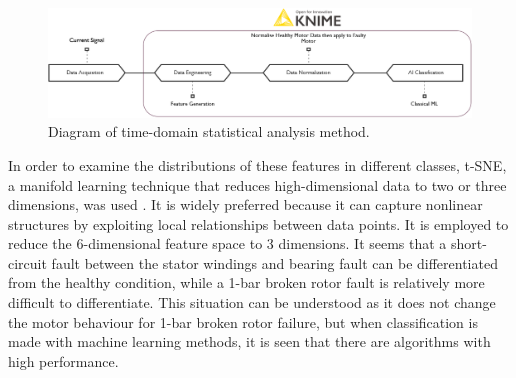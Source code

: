 	
	  

\begin{figure}[h]
	\centering
	\includegraphics[width=400pt,keepaspectratio=true]{./fig/method1.PNG}
	\caption{Diagram of time-domain statistical analysis method.}	
	\label{method1}
\end{figure}

In order to examine the distributions of these features in different classes, t-SNE, a manifold learning technique that reduces high-dimensional data to two or three dimensions, was used \cite{van2008visualizing}. It is widely preferred because it can capture nonlinear structures by exploiting local relationships between data points. It is employed to reduce the 6-dimensional feature space to 3 dimensions. It seems that a short-circuit fault between the stator windings and bearing fault can be differentiated from the healthy condition, while a 1-bar broken rotor fault is relatively more difficult to differentiate. This situation can be understood as it does not change the motor behaviour for 1-bar broken rotor failure, but when classification is made with machine learning methods, it is seen that there are algorithms with high performance.

